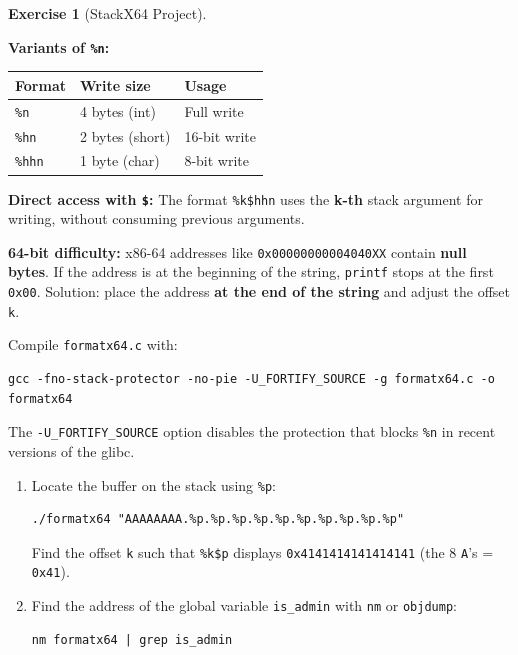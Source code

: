\documentclass[a4paper,11pt]{article}
\theoremstyle{plain}
\theoremstyle{definition}
\newtheorem{exercice}{Exercise}
\begin{document}
\begin{exercice}[StackX64 Project]
\begin{rappel}
\medskip
\textbf{Variants of \texttt{\%n}:}
\begin{center}
\begin{tabular}{lll}
\toprule
\textbf{Format} & \textbf{Write size} & \textbf{Usage} \\
\midrule
\texttt{\%n} & 4 bytes (int) & Full write \\
\texttt{\%hn} & 2 bytes (short) & 16-bit write \\
\texttt{\%hhn} & 1 byte (char) & 8-bit write \\
\bottomrule
\end{tabular}
\end{center}

\medskip
\textbf{Direct access with \texttt{\$}:} The format \texttt{\%k\$hhn} uses the \textbf{k-th} stack argument for writing, without consuming previous arguments.

\medskip
\textbf{64-bit difficulty:} x86-64 addresses like \texttt{0x00000000004040XX} contain \textbf{null bytes}. If the address is at the beginning of the string, \texttt{printf} stops at the first \texttt{0x00}. Solution: place the address \textbf{at the end of the string} and adjust the offset \texttt{k}.
\end{rappel}

\begin{attention}
Compile \texttt{formatx64.c} with:
\begin{lstlisting}[style=GDBStyle]
gcc -fno-stack-protector -no-pie -U_FORTIFY_SOURCE -g formatx64.c -o formatx64
\end{lstlisting}
The \texttt{-U\_FORTIFY\_SOURCE} option disables the protection that blocks \texttt{\%n} in recent versions of the glibc.
\end{attention}

\begin{enumerate}
\item[\textbf{5a)}] Locate the buffer on the stack using \texttt{\%p}:
\begin{lstlisting}[style=GDBStyle]
./formatx64 "AAAAAAAA.%p.%p.%p.%p.%p.%p.%p.%p.%p.%p"
\end{lstlisting}
Find the offset \texttt{k} such that \texttt{\%k\$p} displays \texttt{0x4141414141414141} (the 8 \texttt{A}'s = \texttt{0x41}).

\item[\textbf{5b)}] Find the address of the global variable \texttt{is\_admin} with \texttt{nm} or \texttt{objdump}:
\begin{lstlisting}[style=GDBStyle]
nm formatx64 | grep is_admin
\end{lstlisting}


\end{enumerate}
\end{exercice}
\end{document}
